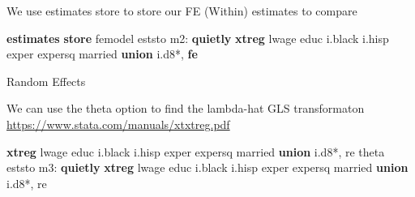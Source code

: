 \documentclass[
]{book}
\newenvironment{Shaded}{\begin{snugshade}}{\end{snugshade}}
\newcommand{\BaseNTok}[1]{\textcolor[rgb]{0.00,0.00,0.81}{#1}}
\newcommand{\KeywordTok}[1]{\textcolor[rgb]{0.13,0.29,0.53}{\textbf{#1}}}
\newcommand{\NormalTok}[1]{#1}
\begin{document}
We use estimates store to store our FE (Within) estimates to compare

\begin{Shaded}
\begin{Highlighting}[]
\KeywordTok{estimates} \KeywordTok{store}\NormalTok{ femodel}
\NormalTok{eststo m2: }\KeywordTok{quietly} \KeywordTok{xtreg}\NormalTok{ lwage educ i.}\BaseNTok{black}\NormalTok{ i.hisp exper expersq married }\KeywordTok{union}\NormalTok{ i.d8*, }\KeywordTok{fe}
\end{Highlighting}
\end{Shaded}

Random Effects

We can use the theta option to find the lambda-hat GLS transformaton
\url{https://www.stata.com/manuals/xtxtreg.pdf}

\begin{Shaded}
\begin{Highlighting}[]
\KeywordTok{xtreg}\NormalTok{ lwage educ i.}\BaseNTok{black}\NormalTok{ i.hisp exper expersq married }\KeywordTok{union}\NormalTok{ i.d8*, re theta}
\NormalTok{eststo m3: }\KeywordTok{quietly} \KeywordTok{xtreg}\NormalTok{ lwage educ i.}\BaseNTok{black}\NormalTok{ i.hisp exper expersq married }\KeywordTok{union}\NormalTok{ i.d8*, re}
\end{Highlighting}
\end{Shaded}
\end{document}
